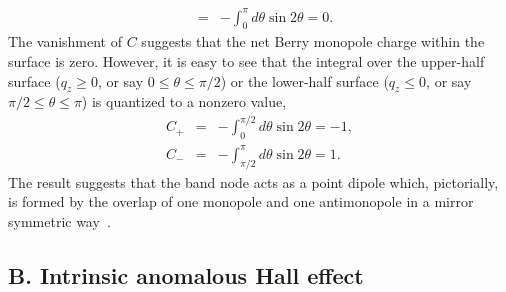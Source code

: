 \documentclass[aps,prl,twocolumn,longbibliography]{revtex4-1}
\begin{document}
\begin{widetext}
\begin{eqnarray}
&=&-\int_{0}^{\pi}d\theta\sin2\theta=0.
\end{eqnarray}
The vanishment of $C$ suggests that the net Berry monopole charge within the surface is zero. However,
it is easy to see that the integral over the upper-half surface ($q_{z}\geq0$, or say $0\leq\theta\leq\pi/2$) or
the lower-half surface ($q_{z}\leq0$, or say $\pi/2\leq\theta\leq\pi$) is quantized to a nonzero value,
\begin{eqnarray}
	C_{+}&=&-\int_{0}^{\pi/2}d\theta\sin2\theta=-1,\nonumber\\
	C_{-}&=&-\int_{\pi/2}^{\pi}d\theta\sin2\theta=1.
	\label{def: Hopf point2}
\end{eqnarray}
The result suggests that the band node acts as a point dipole which, pictorially, is formed
by the overlap of one monopole and one antimonopole in a mirror symmetric way~\cite{Nelson2021hopf}.


\subsection{B. Intrinsic anomalous Hall effect}


\end{widetext}
\end{document}
